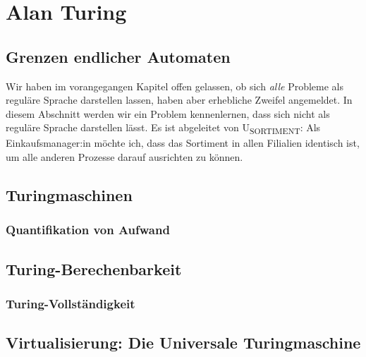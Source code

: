 \chapter{Alan Turing}\label{turing}
\section{Grenzen endlicher Automaten}\label{pumping}
Wir haben im vorangegangen Kapitel offen gelassen,
ob sich \emph{alle} Probleme als reguläre Sprache darstellen lassen,
haben aber erhebliche Zweifel angemeldet.
In diesem Abschnitt werden wir ein Problem kennenlernen,
dass sich nicht als reguläre Sprache darstellen lässt.
Es ist abgeleitet von U\textsubscript{SORTIMENT}:
        Als Einkaufsmanager:in möchte ich,
        dass das Sortiment in allen Filialien identisch ist,
        um alle anderen Prozesse darauf ausrichten zu können.


\section{Turingmaschinen}
\subsection{Quantifikation von Aufwand}
\section{Turing-Berechenbarkeit}
\subsection{Turing-Vollständigkeit}\label{turingVollstaendigkeit}
\section{Virtualisierung: Die Universale Turingmaschine}

